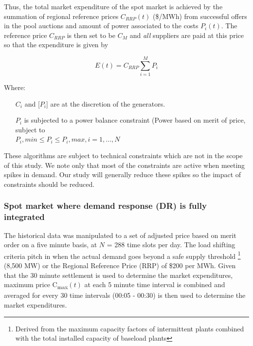 \documentclass{pasa}%
\begin{document}
Thus, the total market expenditure of the spot market is achieved by the summation of regional reference prices $C_{RRP} (t)$ (\$/MWh) from successful offers in the pool auctions and amount of power associated to the costs $P_i (t)$. The reference price $C_{RRP}$ is then set to be $C_M$ and \emph{all} suppliers are paid at this price so that the expenditure is given by

\begin{equation}
  \label{eq:expenditure}
  E (t) = C_{RRP} \sum_{i=1}^M P_{i}
\end{equation}

Where:
\begin{itemize}
    \item [$C_i$] and [$P_i$] are at the discretion of the generators.
    \item [$P_i$] is subjected to a power balance constraint (Power based on  merit of price, subject to \\
    $P_i,min \leq P_i \leq P_i,max,   i = 1,...,N$
\end{itemize}


These algorithms are subject to technical constraints which are not in the scope of this study. We note only that most of the constraints are active when meeting spikes in demand. Our study will generally reduce these spikes so the impact of constraints should be reduced.



\subsubsection{Spot market where demand response (DR) is fully integrated}

The historical data was manipulated to a set of adjusted price based on merit order on a five minute basis, at \(N\) = 288 time slots per day. The load shifting criteria pitch in when the actual demand goes beyond a safe supply threshold \footnote{Derived from the maximum capacity factors of intermittent plants combined with the total installed capacity of baseload plants} (8,500 MW) or the Regional Reference Price (RRP) of \$200 per MWh. Given that the 30 minute settlement is used to determine the market expenditures, maximum price C\textsubscript{max}\((t)\) at each 5 minute time interval is combined and averaged for every 30 time intervals (00:05 - 00:30) is then used to determine the market expenditures. 
\end{document}
